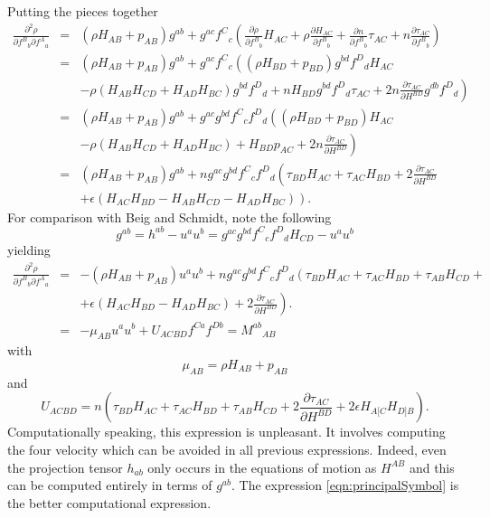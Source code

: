 Putting the pieces together
\begin{eqnarray}
\frac{\partial^2 \rho}{\partial f^B{}_b \partial f^A{}_a} & = & \left( \rho H_{AB} + p_{AB} \right)g^{ab} + g^{ac}f^{C}{}_c\left( \frac{\partial \rho}{\partial f^B{}_b} H_{AC} + \rho \frac{\partial H_{AC}}{\partial f^B{}_b} + \frac{\partial n}{\partial f^B{}_b}\tau_{AC} + n\frac{\partial \tau_{AC}}{\partial f^B{}_b} \right) \\
 & = & \left( \rho H_{AB} + p_{AB} \right)g^{ab} + g^{ac}f^{C}{}_c\left( \left( \rho H_{BD} + p_{BD} \right)g^{bd}f^{D}{}_d H_{AC} \right. \nonumber \\
 && \left. - \rho \left(H_{AB}H_{CD} + H_{AD}H_{BC}\right)g^{bd}f^D{}_d + nH_{BD}g^{bd}f^D{}_d \tau_{AC} + 2n\frac{\partial \tau_{AC}}{\partial H^{BD}} g^{db}f^D{}_d \right) \\
 & = & \left( \rho H_{AB} + p_{AB} \right)g^{ab} + g^{ac}g^{bd}f^{C}{}_cf^{D}{}_d\left( \left( \rho H_{BD} + p_{BD} \right) H_{AC} \right. \nonumber \\
 && \left. - \rho \left(H_{AB}H_{CD} + H_{AD}H_{BC}\right) + H_{BD} p_{AC} + 2n\frac{\partial \tau_{AC}}{\partial H^{BD}} \right) \\
 \label{eqn:principalSymbol}& = & \left( \rho H_{AB} + p_{AB} \right)g^{ab} + ng^{ac}g^{bd}f^{C}{}_cf^{D}{}_d\left( \tau_{BD} H_{AC} + \tau_{AC} H_{BD} + 2\frac{\partial \tau_{AC}}{\partial H^{BD}} \right. \nonumber \\
 && \left. + \epsilon \left( H_{AC}H_{BD} - H_{AB}H_{CD} - H_{AD}H_{BC}\right)\right).
\end{eqnarray}
For comparison with Beig and Schmidt, note the following
\begin{equation}
g^{ab} = h^{ab} - u^au^b = g^{ac} g^{bd} f^C{}_c f^D{}_d H_{CD} - u^au^b
\end{equation}
yielding
\begin{eqnarray}
\frac{\partial^2 \rho}{\partial f^B{}_b \partial f^A{}_a} & = & -\left( \rho H_{AB} + p_{AB} \right)u^au^b + ng^{ac}g^{bd}f^{C}{}_cf^{D}{}_d\left( \tau_{BD} H_{AC} + \tau_{AC} H_{BD} + \tau_{AB}H_{CD} +  \right. \nonumber \\
 && \left. + \epsilon \left( H_{AC}H_{BD} - H_{AD}H_{BC}\right) + 2\frac{\partial \tau_{AC}}{\partial H^{BD}}\right). \\
 & = & - \mu_{AB}u^au^b + U_{ACBD}f^{Ca}f^{Db} = M^{ab}{}_{AB}
\end{eqnarray}
with
\begin{equation}
\mu_{AB} = \rho H_{AB} + p_{AB}
\end{equation}
and
\begin{equation}
U_{ACBD} = n\left(\tau_{BD} H_{AC} + \tau_{AC} H_{BD} + \tau_{AB}H_{CD} + 2\frac{\partial \tau_{AC}}{\partial H^{BD}} + 2\epsilon H_{A[C}H_{D]B}\right).
\end{equation}
Computationally speaking, this expression is unpleasant. It involves computing the four velocity which can be avoided in all previous expressions. Indeed, even the projection tensor $h_{ab}$ only occurs in the equations of motion as $H^{AB}$ and this can be computed entirely in terms of $g^{ab}$. The expression \ref{eqn:principalSymbol} is the better computational expression.

